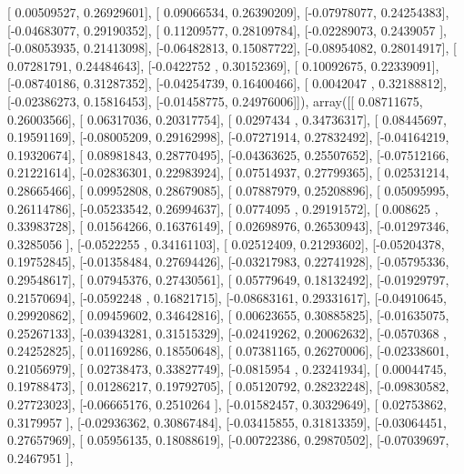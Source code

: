 \documentclass{article}
\begin{document}
       [ 0.00509527,  0.26929601],
       [ 0.09066534,  0.26390209],
       [-0.07978077,  0.24254383],
       [-0.04683077,  0.29190352],
       [ 0.11209577,  0.28109784],
       [-0.02289073,  0.2439057 ],
       [-0.08053935,  0.21413098],
       [-0.06482813,  0.15087722],
       [-0.08954082,  0.28014917],
       [ 0.07281791,  0.24484643],
       [-0.0422752 ,  0.30152369],
       [ 0.10092675,  0.22339091],
       [-0.08740186,  0.31287352],
       [-0.04254739,  0.16400466],
       [ 0.0042047 ,  0.32188812],
       [-0.02386273,  0.15816453],
       [-0.01458775,  0.24976006]]), array([[ 0.08711675,  0.26003566],
       [ 0.06317036,  0.20317754],
       [ 0.0297434 ,  0.34736317],
       [ 0.08445697,  0.19591169],
       [-0.08005209,  0.29162998],
       [-0.07271914,  0.27832492],
       [-0.04164219,  0.19320674],
       [ 0.08981843,  0.28770495],
       [-0.04363625,  0.25507652],
       [-0.07512166,  0.21221614],
       [-0.02836301,  0.22983924],
       [ 0.07514937,  0.27799365],
       [ 0.02531214,  0.28665466],
       [ 0.09952808,  0.28679085],
       [ 0.07887979,  0.25208896],
       [ 0.05095995,  0.26114786],
       [-0.05233542,  0.26994637],
       [ 0.0774095 ,  0.29191572],
       [ 0.008625  ,  0.33983728],
       [ 0.01564266,  0.16376149],
       [ 0.02698976,  0.26530943],
       [-0.01297346,  0.3285056 ],
       [-0.0522255 ,  0.34161103],
       [ 0.02512409,  0.21293602],
       [-0.05204378,  0.19752845],
       [-0.01358484,  0.27694426],
       [-0.03217983,  0.22741928],
       [-0.05795336,  0.29548617],
       [ 0.07945376,  0.27430561],
       [ 0.05779649,  0.18132492],
       [-0.01929797,  0.21570694],
       [-0.0592248 ,  0.16821715],
       [-0.08683161,  0.29331617],
       [-0.04910645,  0.29920862],
       [ 0.09459602,  0.34642816],
       [ 0.00623655,  0.30885825],
       [-0.01635075,  0.25267133],
       [-0.03943281,  0.31515329],
       [-0.02419262,  0.20062632],
       [-0.0570368 ,  0.24252825],
       [ 0.01169286,  0.18550648],
       [ 0.07381165,  0.26270006],
       [-0.02338601,  0.21056979],
       [ 0.02738473,  0.33827749],
       [-0.0815954 ,  0.23241934],
       [ 0.00044745,  0.19788473],
       [ 0.01286217,  0.19792705],
       [ 0.05120792,  0.28232248],
       [-0.09830582,  0.27723023],
       [-0.06665176,  0.2510264 ],
       [-0.01582457,  0.30329649],
       [ 0.02753862,  0.3179957 ],
       [-0.02936362,  0.30867484],
       [-0.03415855,  0.31813359],
       [-0.03064451,  0.27657969],
       [ 0.05956135,  0.18088619],
       [-0.00722386,  0.29870502],
       [-0.07039697,  0.2467951 ],
\end{document}
